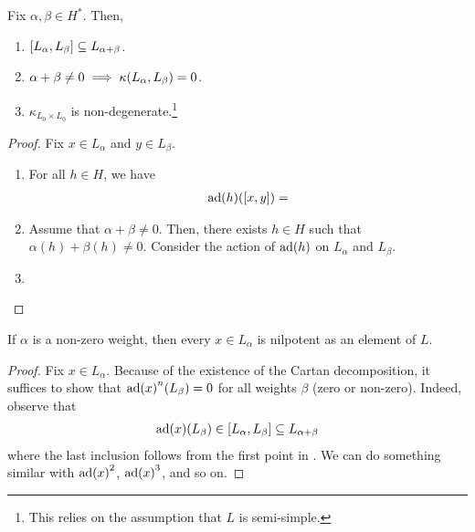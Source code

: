 \begin{boxlemma}\label{Ch3:Lemma:BehaviourOfWeights}
    Fix $\alpha, \beta \in H^*$. Then,
    \begin{enumerate}[label = \normalfont \arabic*., noitemsep]
        \item $\left[ L_{\alpha}, L_{\beta} \right] \subseteq L_{\alpha + \beta}$.
        \item $\alpha + \beta \neq 0 \implies \kappa\!\left( L_{\alpha}, L_{\beta} \right) = 0$.
        \item $\kappa_{L_0 \times L_0}$ is non-degenerate.\footnote{This relies on the assumption that $L$ is semi-simple.}
    \end{enumerate}
\end{boxlemma}
\begin{proof}
    Fix $x \in L_{\alpha}$ and $y \in L_{\beta}$.
    \begin{enumerate}
        \item For all $h \in H$, we have
        \begin{align*}
            \operatorname{ad}\!\left( h \right)\!\left( \left[ x, y \right] \right) = 
        \end{align*}
        \sorry

        \item Assume that $\alpha + \beta \neq 0$. Then, there exists $h \in H$ such that $\alpha(h) + \beta(h) \neq 0$. Consider the action of $\operatorname{ad}\!\left( h \right)$ on $L_{\alpha}$ and $L_{\beta}$. \sorry
        
        \item \sorry %
    \end{enumerate}
\end{proof}

\begin{corollary}
    If $\alpha$ is a non-zero weight, then every $x \in L_{\alpha}$ is nilpotent as an element of $L$.
\end{corollary}
\begin{proof}
    Fix $x \in L_{\alpha}$. Because of the existence of the Cartan decomposition, it suffices to show that $\operatorname{ad}\!\left( x \right)^n\!\left( L_{\beta} \right) = 0$ for all weights $\beta$ (zero or non-zero). Indeed, observe that
    \begin{align*}
        \operatorname{ad}\!\left( x \right)\!\left( L_{\beta} \right) \in \left[ L_{\alpha}, L_{\beta} \right] \subseteq L_{\alpha + \beta}
    \end{align*}
    where the last inclusion follows from the first point in . We can do something similar with $\operatorname{ad}\!\left( x \right)^2$, $\operatorname{ad}\!\left( x \right)^3$, and so on. \sorry %
\end{proof}


